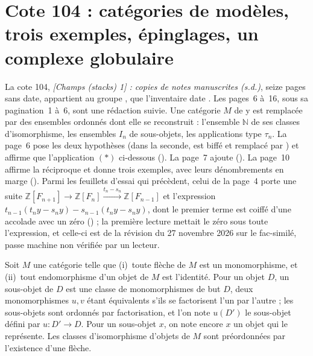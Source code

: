 \section[Cote 104 : catégories de modèles, trois exemples, épinglages, un complexe globulaire]{Cote 104 : catégories de modèles, trois exemples, épinglages, un complexe globulaire\protect{}}\label{sec:104}

La cote 104, \emph{[Champs (stacks) 1] : copies de notes manuscrites (s.d.)}, seize pages sans date, appartient au groupe , que l'inventaire date . Les pages~6 à~16, sous sa pagination~1 à~6, sont une rédaction suivie. Une catégorie $M$ de  y est remplacée par des ensembles ordonnés dont elle se reconstruit : l'ensemble $\mathbb N$ de ses classes d'isomorphisme, les ensembles $I_n$ de sous-objets, les applications type $\tau_n$. La page~6 pose les deux hypothèses (dans la seconde,  est biffé et remplacé par ) et affirme que l'application $(*)$ ci-dessous  (\mbox{}). La page~7 ajoute  (). La page~10 affirme la réciproque et donne trois exemples, avec leurs dénombrements en marge (). Parmi les feuillets d'essai qui précèdent, celui de la page~4 porte une suite $\mathbb Z[F_{n+1}] \to \mathbb Z[F_n] \xrightarrow{t_n - s_n} \mathbb Z[F_{n-1}]$ et l'expression $t_{n-1}(t_n y - s_n y) - s_{n-1}(t_n y - s_n y)$, dont le premier terme est coiffé d'une accolade avec un zéro () ; la première lecture mettait le zéro sous toute l'expression, et celle-ci est de la révision du 27 novembre 2026 sur le fac-similé, passe machine non vérifiée par un lecteur.

\begin{definition}
Soit $M$ une catégorie telle que (i)~toute flèche de $M$ est un monomorphisme, et (ii)~tout endomorphisme d'un objet de $M$ est l'identité. Pour un objet $D$, un sous-objet de $D$ est une classe de monomorphismes de but $D$, deux monomorphismes $u, v$ étant équivalents s'ils se factorisent l'un par l'autre ; les sous-objets sont ordonnés par factorisation, et l'on note $u(D')$ le sous-objet défini par $u : D' \to D$. Pour un sous-objet $x$, on note encore $x$ un objet qui le représente. Les classes d'isomorphisme d'objets de $M$ sont préordonnées par l'existence d'une flèche.
\end{definition}

